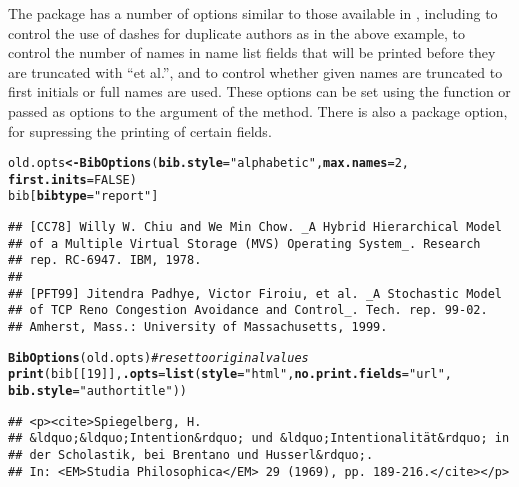 \documentclass[article]{jss}\usepackage[]{graphicx}\usepackage[]{color}
\makeatletter
\newcommand{\hlnum}[1]{\textcolor[rgb]{0.125,0.125,1}{#1}}%
\newcommand{\hlstr}[1]{\textcolor[rgb]{0.125,0.125,1}{#1}}%
\newcommand{\hlcom}[1]{\textcolor[rgb]{1,0,0.753}{\textit{#1}}}%
\newcommand{\hlstd}[1]{\textcolor[rgb]{0.251,0.251,0.282}{#1}}%
\newcommand{\hlkwb}[1]{\textcolor[rgb]{0.439,0.251,1}{\textbf{#1}}}%
\newcommand{\hlkwc}[1]{\textcolor[rgb]{0.529,0,0.184}{\textbf{#1}}}%
\newcommand{\hlkwd}[1]{\textcolor[rgb]{0.251,0.251,0.282}{\textbf{#1}}}%
\newenvironment{kframe}{%
 \def\at@end@of@kframe{}%
 \ifinner\ifhmode%
  \def\at@end@of@kframe{\end{minipage}}%
  \begin{minipage}{\columnwidth}%
 \fi\fi%
 \def\FrameCommand##1{\hskip\@totalleftmargin \hskip-\fboxsep
 \colorbox{shadecolor}{##1}\hskip-\fboxsep
     \hskip-\linewidth \hskip-\@totalleftmargin \hskip\columnwidth}%
 \MakeFramed {\advance\hsize-\width
   \@totalleftmargin\z@ \linewidth\hsize
   \@setminipage}}%
 {\par\unskip\endMakeFramed%
 \at@end@of@kframe}
\newenvironment{knitrout}{}{} %
\makeatother
\begin{document}
The package has a number of options similar to those available in \Biblatex{}, including  to control the use of dashes for duplicate authors as in the above example,  to control the number of names in name list fields that will be printed before they are truncated with ``et al.'', and  to control whether given names are truncated to first initials or full names are used.  These options can be set using the  function or passed as options to the  argument of the  method. There is also a package option,  for supressing the printing of certain fields.
\begin{knitrout}
\color{fgcolor}\begin{kframe}
\begin{alltt}
\hlstd{old.opts} \hlkwb{<-} \hlkwd{BibOptions}\hlstd{(}\hlkwc{bib.style} \hlstd{=} \hlstr{"alphabetic"}\hlstd{,} \hlkwc{max.names} \hlstd{=} \hlnum{2}\hlstd{,}
                       \hlkwc{first.inits} \hlstd{=} \hlnum{FALSE}\hlstd{)}
\hlstd{bib[}\hlkwc{bibtype} \hlstd{=} \hlstr{"report"}\hlstd{]}
\end{alltt}
\begin{verbatim}
## [CC78] Willy W. Chiu and We Min Chow. _A Hybrid Hierarchical Model
## of a Multiple Virtual Storage (MVS) Operating System_. Research
## rep. RC-6947. IBM, 1978.
## 
## [PFT99] Jitendra Padhye, Victor Firoiu, et al. _A Stochastic Model
## of TCP Reno Congestion Avoidance and Control_. Tech. rep. 99-02.
## Amherst, Mass.: University of Massachusetts, 1999.
\end{verbatim}
\begin{alltt}
\hlkwd{BibOptions}\hlstd{(old.opts)}  \hlcom{# reset to original values}
\hlkwd{print}\hlstd{(bib[[}\hlnum{19}\hlstd{]],} \hlkwc{.opts} \hlstd{=} \hlkwd{list}\hlstd{(}\hlkwc{style} \hlstd{=} \hlstr{"html"}\hlstd{,} \hlkwc{no.print.fields} \hlstd{=} \hlstr{"url"}\hlstd{,}
      \hlkwc{bib.style} \hlstd{=} \hlstr{"authortitle"}\hlstd{))}
\end{alltt}
\begin{verbatim}
## <p><cite>Spiegelberg, H.
## &ldquo;&ldquo;Intention&rdquo; und &ldquo;Intentionalität&rdquo; in
## der Scholastik, bei Brentano und Husserl&rdquo;.
## In: <EM>Studia Philosophica</EM> 29 (1969), pp. 189-216.</cite></p>
\end{verbatim}
\end{kframe}
\end{knitrout}
\end{document}
